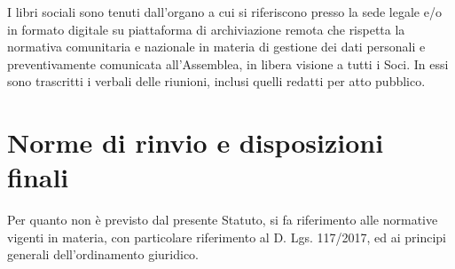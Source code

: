 \documentclass[legalpaper, 11pt]{exam}
\let\tempone\enumerate
\let\temptwo\endenumerate
\renewenvironment{enumerate}{\tempone\addtolength{\itemsep}{-0.45\baselineskip}}{\temptwo}
\begin{document}
{\begin{enumerate}
 \item I libri sociali sono tenuti dall'organo a cui si riferiscono presso la sede legale e/o in formato digitale su piattaforma di archiviazione remota che rispetta la normativa comunitaria e nazionale in materia di gestione dei dati personali e preventivamente comunicata all’Assemblea, in libera visione a tutti i Soci. In essi sono trascritti i verbali delle riunioni, inclusi quelli redatti per atto pubblico.
\end{enumerate}

\section{Norme di rinvio e disposizioni finali}
\begin{enumerate}
 \item Per quanto non è previsto dal presente Statuto, si fa riferimento alle normative vigenti in materia, con particolare riferimento al D. Lgs. 117/2017, ed ai principi generali dell’ordinamento giuridico.
\end{enumerate}
}
\end{document}
